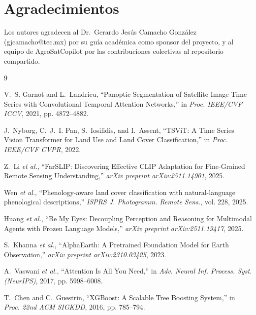 \documentclass{article}
\begin{document}
\section*{Agradecimientos}
Los autores agradecen al Dr.\ Gerardo Jesús Camacho González
(gjcamacho@tec.mx) por su guía académica como sponsor del proyecto, y al
equipo de AgroSatCopilot por las contribuciones colectivas al repositorio
compartido.




\begin{thebibliography}{9}

V.~S. Garnot and L.~Landrieu,
``Panoptic Segmentation of Satellite Image Time Series with Convolutional
Temporal Attention Networks,''
in \textit{Proc. IEEE/CVF ICCV}, 2021, pp. 4872--4882.

J.~Nyborg, C.~J.~I. Pan, S.~Iosifidis, and I.~Assent,
``TSViT: A Time Series Vision Transformer for Land Use and Land Cover
Classification,''
in \textit{Proc. IEEE/CVF CVPR}, 2022.

Z.~Li \textit{et al.},
``FarSLIP: Discovering Effective CLIP Adaptation for Fine-Grained Remote
Sensing Understanding,''
\textit{arXiv preprint arXiv:2511.14901}, 2025.

Wen \textit{et al.},
``Phenology-aware land cover classification with natural-language
phenological descriptions,''
\textit{ISPRS J. Photogramm. Remote Sens.}, vol. 228, 2025.

Huang \textit{et al.},
``Be My Eyes: Decoupling Perception and Reasoning for Multimodal Agents with
Frozen Language Models,''
\textit{arXiv preprint arXiv:2511.19417}, 2025.

S.~Khanna \textit{et al.},
``AlphaEarth: A Pretrained Foundation Model for Earth Observation,''
\textit{arXiv preprint arXiv:2310.03425}, 2023.

A.~Vaswani \textit{et al.},
``Attention Is All You Need,''
in \textit{Adv. Neural Inf. Process. Syst. (NeurIPS)}, 2017,
pp. 5998--6008.

T.~Chen and C.~Guestrin,
``XGBoost: A Scalable Tree Boosting System,''
in \textit{Proc. 22nd ACM SIGKDD}, 2016, pp. 785--794.

\end{thebibliography}
\end{document}
